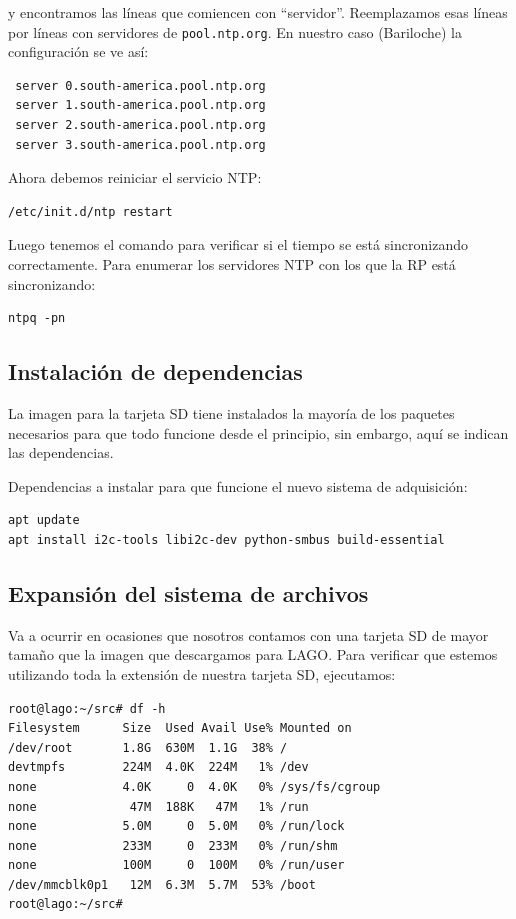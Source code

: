 \documentclass[a4paper,11pt]{article}
\begin{document}
\noindent y encontramos las líneas que comiencen con ``servidor''. Reemplazamos esas líneas
por líneas con servidores de \texttt{pool.ntp.org}. En nuestro caso (Bariloche)
la configuración se ve así:

\begin{verbatim}
 server 0.south-america.pool.ntp.org
 server 1.south-america.pool.ntp.org
 server 2.south-america.pool.ntp.org
 server 3.south-america.pool.ntp.org
\end{verbatim}

\noindent Ahora debemos reiniciar el servicio NTP:

\begin{verbatim}
/etc/init.d/ntp restart
\end{verbatim}

\noindent Luego tenemos el comando para verificar si el tiempo se está
sincronizando correctamente. Para enumerar los servidores NTP con los que la RP está
sincronizando:

\begin{verbatim}
ntpq -pn
\end{verbatim}

\subsection{Instalación de dependencias}

La imagen para la tarjeta SD tiene instalados la mayoría de los paquetes
necesarios para que todo funcione desde el principio, sin embargo, aquí se
indican las dependencias.

\noindent Dependencias a instalar para que funcione el nuevo sistema de
adquisición:

\begin{verbatim}
apt update
apt install i2c-tools libi2c-dev python-smbus build-essential
\end{verbatim}

\subsection{Expansión del sistema de archivos}\label{subsub_expansion_sd}
Va a ocurrir en ocasiones que nosotros contamos con una tarjeta SD de mayor
tamaño que la imagen que descargamos para LAGO. Para verificar que estemos
utilizando toda la extensión de nuestra tarjeta SD, ejecutamos: 

\begin{verbatim}
root@lago:~/src# df -h
Filesystem      Size  Used Avail Use% Mounted on
/dev/root       1.8G  630M  1.1G  38% /
devtmpfs        224M  4.0K  224M   1% /dev
none            4.0K     0  4.0K   0% /sys/fs/cgroup
none             47M  188K   47M   1% /run
none            5.0M     0  5.0M   0% /run/lock
none            233M     0  233M   0% /run/shm
none            100M     0  100M   0% /run/user
/dev/mmcblk0p1   12M  6.3M  5.7M  53% /boot
root@lago:~/src# 

\end{verbatim}
\end{document}
